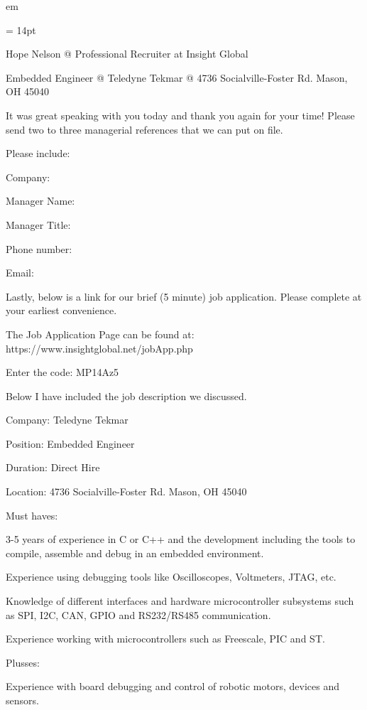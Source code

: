 

 em

\FFrf \baselineskip = 14pt



\centerline{
Hope Nelson @ Professional Recruiter at Insight Global
}
\centerline{
Embedded Engineer @ Teledyne Tekmar @ 4736 Socialville-Foster Rd. Mason, OH 45040
} 

\par It was great speaking with you today and thank you again for your time! Please send two to three managerial references that we can put on file.
\par Please include:
\par Company:
\par Manager Name:
\par Manager Title:
\par Phone number:
\par Email:
\par Lastly, below is a link for our brief (5 minute) job application. Please complete at your earliest convenience.
\par The Job Application Page can be found at: https://www.insightglobal.net/jobApp.php
\par Enter the code: MP14Az5
\par Below I have included the job description we discussed.
\par Company: Teledyne Tekmar
\par Position: Embedded Engineer
\par Duration: Direct Hire
\par Location: 4736 Socialville-Foster Rd. Mason, OH 45040
\par Must haves:
\par 3-5 years of experience in C or C++ and the development including the tools to compile, assemble and debug in an embedded environment.
\par Experience using debugging tools like Oscilloscopes, Voltmeters, JTAG, etc.
\par Knowledge of different interfaces and hardware microcontroller subsystems such as SPI, I2C, CAN, GPIO and RS232/RS485 communication.
\par Experience working with microcontrollers such as Freescale, PIC and ST.
\par Plusses:
\par Experience with board debugging and control of robotic motors, devices and sensors.
